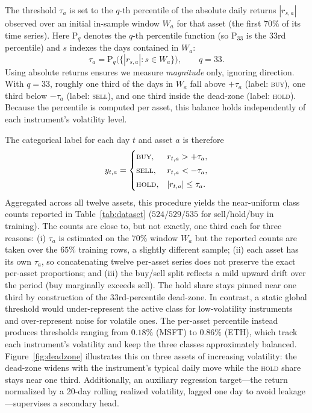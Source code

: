 \documentclass[runningheads]{llncs}
\begin{document}
The threshold $\tau_a$ is set to the $q$-th percentile of the absolute daily
returns $|r_{s,a}|$ observed over an initial in-sample window $W_a$ for that
asset (the first $70\%$ of its time series). Here $\mathrm{P}_q$ denotes the
$q$-th percentile function (so $\mathrm{P}_{33}$ is the 33rd percentile) and
$s$ indexes the days contained in $W_a$:
\begin{equation}
\tau_a = \mathrm{P}_{q}\big(\{|r_{s,a}| : s \in W_a\}\big),
\qquad q = 33.
\end{equation}
Using absolute returns ensures we measure \emph{magnitude} only, ignoring
direction. With $q = 33$, roughly one third of the days in $W_a$ fall above
$+\tau_a$ (label: \textsc{buy}), one third below $-\tau_a$ (label:
\textsc{sell}), and one third inside the dead-zone (label: \textsc{hold}).
Because the percentile is computed per asset, this balance holds
independently of each instrument's volatility level.

The categorical label for each day $t$ and asset $a$ is therefore
\begin{equation}
y_{t,a}=
\begin{cases}
\textsc{buy}, & r_{t,a} > +\tau_a,\\[2pt]
\textsc{sell}, & r_{t,a} < -\tau_a,\\[2pt]
\textsc{hold}, & |r_{t,a}| \le \tau_a.
\end{cases}
\end{equation}
Aggregated across all twelve assets, this procedure yields the near-uniform
class counts reported in Table~\ref{tab:dataset} ($524/529/535$ for
sell/hold/buy in training). The counts are close to, but not exactly, one third
each for three reasons: (i) $\tau_a$ is estimated on the $70\%$ window $W_a$ but
the reported counts are taken over the $65\%$ training rows, a slightly
different sample; (ii) each asset has its own $\tau_a$, so concatenating twelve
per-asset series does not preserve the exact per-asset proportions; and (iii)
the buy/sell split reflects a mild upward drift over the period (buy marginally
exceeds sell). The hold share stays pinned near one third by construction of the
$33$rd-percentile dead-zone.
In contrast, a static global threshold would under-represent the active class
for low-volatility instruments and over-represent noise for volatile ones.
The per-asset percentile instead produces thresholds ranging from $0.18\%$ (MSFT)
to $0.86\%$ (ETH), which track each instrument's volatility and keep the three
classes approximately balanced. Figure~\ref{fig:deadzone} illustrates this on
three assets of increasing volatility: the dead-zone widens with the
instrument's typical daily move while the \textsc{hold} share stays near one
third. Additionally, an auxiliary regression target---the return normalized by a
20-day rolling realized volatility, lagged one day to avoid leakage---supervises
a secondary head.
\end{document}
